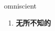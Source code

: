 
\begin{frame}
{\huge omniscient}
\begin{center}
\begin{enumerate}\Large
  \item \textbf{无所不知的}
\end{enumerate}
\end{center}
\end{frame}

